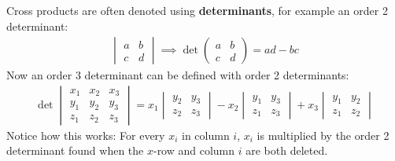 \documentclass{article}
\begin{document}
Cross products are often denoted using \textbf{determinants}, for example an order 2 determinant:
\begin{gather*}
    \begin{vmatrix}
    a & b\\
    c & d
    \end{vmatrix}
    \implies
    \det
    \begin{pmatrix}
    a & b\\
    c & d
    \end{pmatrix}
    = ad - bc
\end{gather*}
Now an order 3 determinant can be defined with order 2 determinants:
\begin{gather*}
\det
    \begin{vmatrix}
    x_1 & x_2 & x_3\\
    y_1 & y_2 & y_3\\
    z_1 & z_2 & z_3
    \end{vmatrix}
    =
    x_1
    \begin{vmatrix}
    y_2 & y_3\\
    z_2 & z_3
    \end{vmatrix}
    - x_2
    \begin{vmatrix}
    y_1 & y_3\\
    z_1 & z_3
    \end{vmatrix}
    + x_3
    \begin{vmatrix}
    y_1 & y_2\\
    z_1 & z_2
    \end{vmatrix}
\end{gather*}
Notice how this works: For every $x_i$ in column $i$, $x_i$ is multiplied by the order 2 determinant found when the $x$-row and column $i$ are both deleted.
\end{document}
